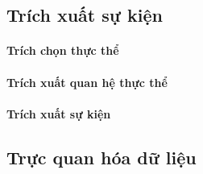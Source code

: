 \subsection{Trích xuất sự kiện}
\label{ee}
\paragraph{Trích chọn thực thể}



\paragraph{Trích xuất quan hệ thực thể}


\paragraph{Trích xuất sự kiện}



\subsection{Trực quan hóa dữ liệu}
\label{vi}







